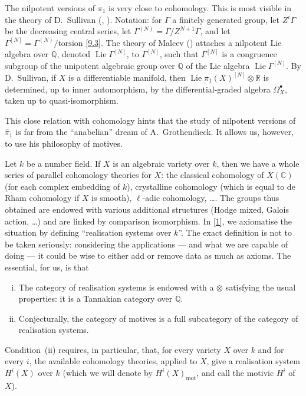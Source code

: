 \documentclass{article}
\theoremstyle{definition}
\newcommand{\mot}{\mathrm{mot}}
\newcommand{\bb}{\mathbb}
\newcommand{\RR}{\bb{R}}
\newcommand{\CC}{\bb{C}}
\newcommand{\QQ}{\bb{Q}}
\DeclareMathOperator{\Lie}{Lie}
\newcommand{\oldpage}[1]{\marginpar{\footnotesize$\Big\vert$ \textit{p.~#1}}}
\begin{document}
The nilpotent versions of $\pi_1$ is very close to cohomology.
This is most visible in the theory of D.~Sullivan (\cite{Su}, \cite{Mo}).
Notation: for $\Gamma$ a finitely generated group, let $Z^i\Gamma$ be the decreasing central series, let $\Gamma^{(N)}=\Gamma/Z^{N+1}\Gamma$, and let $\Gamma^{[N]}=\Gamma^{(N)}/\mathrm{torsion}$ \cref{9.3}.
The theory of Malcev (\cite{Mal}) attaches a nilpotent Lie algebra over $\QQ$, denoted $\Lie\Gamma^{[N]}$, to $\Gamma^{[N]}$, such that $\Gamma^{[N]}$ is a congruence subgroup of the unipotent algebraic group over $\QQ$ of the Lie algebra $\Lie\Gamma^{[N]}$.
By D.~Sullivan, if $X$ is a differentiable manifold, then $\Lie\pi_1(X)^{[N]}\otimes\RR$ is determined, up to inner automorphism, by the differential-graded algebra $\Omega_X^\bullet$, taken
\oldpage{82}
up to quasi-isomorphism.

This close relation with cohomology hints that the study of nilpotent versions of $\hat{\pi}_1$ is far from the ``anabelian'' dream of A.~Grothendieck.
It allows us, however, to use his philosophy of motives.

Let $k$ be a number field.
If $X$ is an algebraic variety over $k$, then we have a whole series of parallel cohomology theories for $X$: the classical cohomology of $X(\CC)$ (for each complex embedding of $k$), crystalline cohomology (which is equal to de Rham cohomology if $X$ is smooth), $\ell$-adic cohomology, \ldots.
The groups thus obtained are endowed with various additional structures (Hodge mixed, Galois action, \ldots) and are linked by comparison isomorphism.
In \cref{1}, we axiomatise the situation by defining ``realisation systems over $k$''.
The exact definition is not to be taken seriously: considering the applications --- and what we are capable of doing --- it could be wise to either add or remove data as much as axioms.
The essential, for us, is that
\begin{enumerate}[(i)]
  \item The category of realisation systems is endowed with a $\otimes$ satisfying the usual properties: it is a Tannakian category over $\QQ$.
  \item Conjecturally, the category of motives is a full subcategory of the category of realisation systems.
\end{enumerate}

Condition~(ii) requires, in particular, that, for every variety $X$ over $k$ and for every $i$, the available cohomology theories, applied to $X$, give a realisation system $H^i(X)$ over $k$ (which we will denote by $H^i(X)_\mot$, and call the motivic $H^i$ of $X$).
\end{document}
